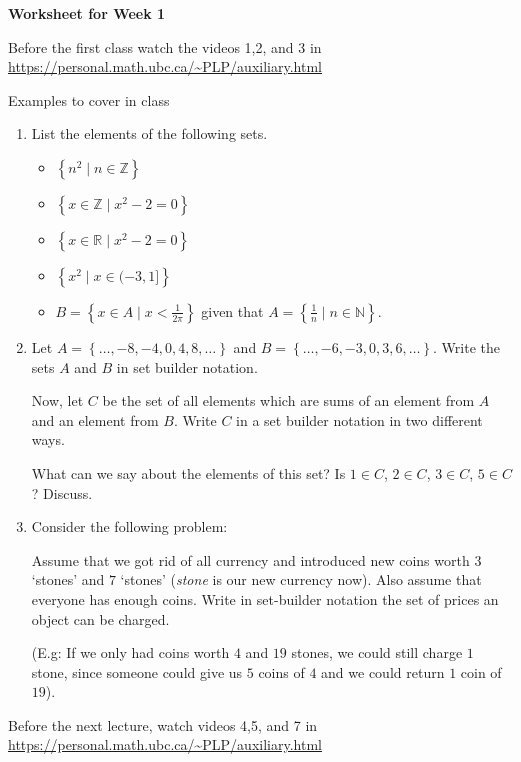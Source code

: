 \documentclass[12pt]{article}
\newcommand{\set}[1]{\left\{ #1 \right\}}
\begin{document}
\centerline{\bf\large Worksheet for Week 1}

\vspace{25pt}

Before the first class watch the videos 1,2, and 3 in \url{https://personal.math.ubc.ca/~PLP/auxiliary.html}

Examples to cover in class

\begin{enumerate}

\item List the elements of the following sets.

\begin{itemize}

\item $\set{n^2 \mid n\in\mathbb Z}$

\item $\set{x\in\mathbb Z \mid x^2-2=0}$

\item $\set{x\in\mathbb R \mid x^2-2=0}$

\item $\set{x^2\mid x\in (-3, 1]}$

\item $B=\set{x\in A\mid x<\frac{1}{2\pi}}$ given that  $A=\set{\frac{1}{n}\mid n\in\mathbb N}$.

\end{itemize}


\item  Let $A=\set{\ldots, -8, -4, 0, 4, 8, \ldots}$ and $B=\set{\ldots, -6, -3, 0, 3, 6, \ldots}$.  Write the sets $A$ and $B$ in set builder notation.

Now, let $C$ be the set of all elements which are sums of an element from  $A$ and an element from $B$. Write $C$ in a set builder notation in two different ways.

What can we say about the elements of this set? Is $1\in C$, $2\in C$, $3\in C$, $5\in C$? Discuss.

\item Consider the following problem:

Assume that we got rid of all currency and introduced new coins worth $3$ `stones' and $7$ `stones' ({\it stone} is our new currency now). Also assume that everyone has enough coins. Write in set-builder notation the set of prices an object can be charged.

(E.g: If we only had coins worth $4$ and $19$ stones, we could still charge $1$ stone, since someone could give us $5$ coins of $4$ and we could return $1$ coin of $19$).


\end{enumerate}

Before the next lecture, watch  videos 4,5, and 7 in \url{https://personal.math.ubc.ca/~PLP/auxiliary.html}
\end{document}

